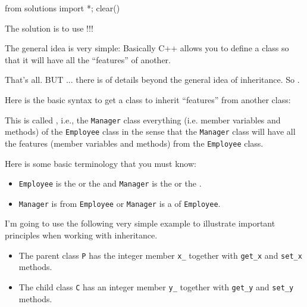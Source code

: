 \begin{python0}
from solutions import *; clear()
\end{python0}

The solution is to use !!!

The general idea is very simple: Basically C++ allows you to define a
class so that it will have all the ``features'' of another.

That's all. BUT ... there is  of details beyond the
general idea of inheritance. So .

Here is the basic syntax to get a class to inherit ``features'' from
another class:

This is called , i.e., the \texttt{Manager}
class  everything (i.e. member variables and methods)
of the \texttt{Employee} class in the sense that the \texttt{Manager} class
will have all the features (member variables and methods) from the
\texttt{Employee} class.

Here is some basic terminology that you must know:

\begin{itemize}
\item
  \texttt{Employee} is the  or the
   and \texttt{Manager} is the  or
  the .
\item
  \texttt{Manager} is  from \texttt{Employee} or
  \texttt{Manager} is a  of \texttt{Employee}.
\end{itemize}

I'm going to use the following very simple example to illustrate
important principles when working with inheritance.

\begin{itemize}
\item
  The parent class \texttt{P} has the integer member \verb!x_! together
  with \verb!get_x! and \verb!set_x! methods.
\item
  The child class \texttt{C} has an integer member \verb!y_! together
  with \verb!get_y! and \verb!set_y! methods.
\end{itemize}

